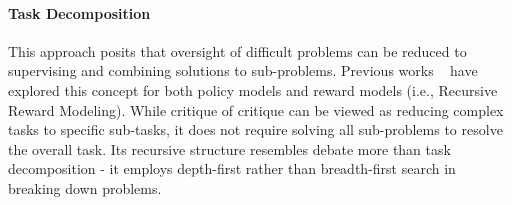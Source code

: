 \vspace{-3mm}

\paragraph{Task Decomposition} This approach posits that oversight of difficult problems can be reduced to supervising and combining solutions to sub-problems. Previous works ~\citep{christiano2018supervising,wu2021recursivelysummarizingbookshuman} have explored this concept for both policy models and reward models (i.e., Recursive Reward Modeling). While critique of critique can be viewed as reducing complex tasks to specific sub-tasks, it does not require solving all sub-problems to resolve the overall task. Its recursive structure resembles debate more than task decomposition - it employs depth-first rather than breadth-first search in breaking down problems.